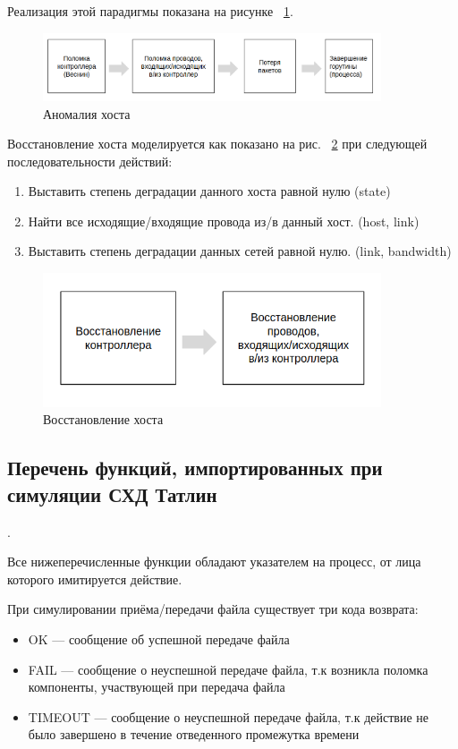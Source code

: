 Реализация этой парадигмы показана на рисунке ~\ref{fig:anom-host}.

\begin{figure}[!ht]
\centering
\includegraphics[width=10cm]{Kenenbek/images/anom-scheme-host.png}
\caption{Аномалия хоста}
\label{fig:anom-host}
\end{figure}

Восстановление хоста моделируется как показано на рис. ~\ref{fig:repai-host} при следующей последовательности действий:

\begin{enumerate}
\item Выставить степень деградации данного хоста равной нулю (state)
\item Найти все исходящие/входящие провода из/в данный хост. (host, link)
\item Выставить степень деградации данных сетей равной нулю. (link, bandwidth)
\end{enumerate}

\begin{figure}[!ht]
\centering
\includegraphics[width=10cm]{Kenenbek/images/repair-host.png}
\caption{Восстановление хоста}
\label{fig:repai-host}
\end{figure}

\subsection{Перечень функций, импортированных при симуляции СХД Татлин}.

Все нижеперечисленные функции обладают указателем на процесс, от лица которого имитируется действие.

При симулировании приёма/передачи файла существует три кода возврата:
\begin{itemize}
\item OK --- сообщение об успешной передаче файла
\item FAIL --- сообщение о неуспешной передаче файла, т.к возникла поломка компоненты, участвующей при передача файла
\item TIMEOUT --- сообщение о неуспешной передаче файла, т.к действие не было завершено в течение отведенного промежутка времени
\end{itemize}  

